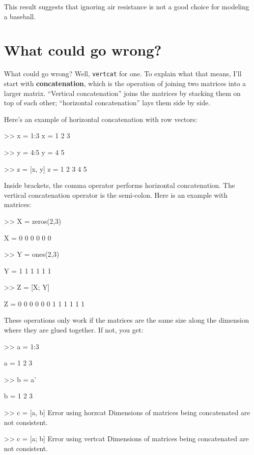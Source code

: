 \documentclass[
]{book}
\numberwithin{Answer}{chapter}
\numberwithin{Exercise}{chapter}
\begin{document}
This result suggests that ignoring air resistance is not a good choice for modeling a baseball.


\section{What could go wrong?}

What could go wrong?  Well, {\tt vertcat} for one.  To explain
what that means, I'll start with {\bf concatenation}, which is
the operation of joining two matrices into a larger matrix.
``Vertical concatenation'' joins the matrices by stacking them on
top of each other; ``horizontal concatenation'' lays them
side by side.


Here's an example of horizontal concatenation with row vectors:

\begin{code}
>> x = 1:3
x = 1     2     3

>> y = 4:5
y = 4     5

>> z = [x, y]
z = 1     2     3     4     5
\end{code}

Inside brackets, the comma operator performs horizontal concatenation.
The vertical concatenation operator is the semi-colon.  Here is an
example with matrices:


\begin{code}
>> X = zeros(2,3)

X =  0     0     0
     0     0     0

>> Y = ones(2,3)

Y =  1     1     1
     1     1     1

>> Z = [X; Y]

Z =  0     0     0
     0     0     0
     1     1     1
     1     1     1
\end{code}

These operations only work if the matrices are the same size along
the dimension where they are glued together.  If not, you get:

\begin{code}
>> a = 1:3

a = 1     2     3

>> b = a'

b =  1
     2
     3

>> c = [a, b]
Error using horzcat
Dimensions of matrices being concatenated are not consistent.

>> c = [a; b]
Error using vertcat
Dimensions of matrices being concatenated are not consistent.
\end{code}
\end{document}

